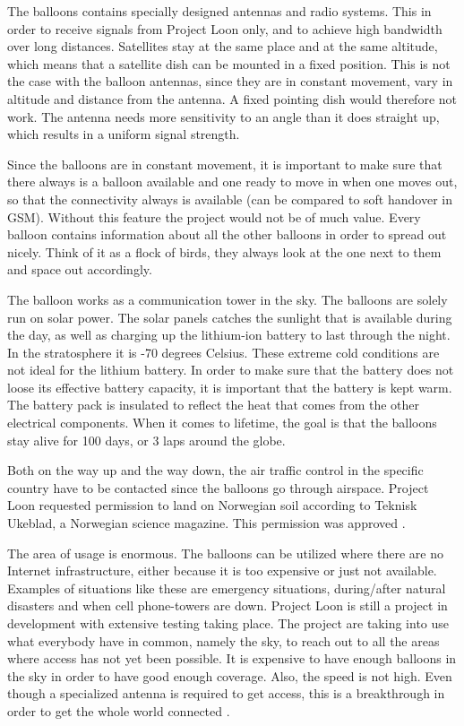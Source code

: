The balloons contains specially designed antennas and radio systems. This in order to receive signals from Project Loon only, and to achieve high bandwidth over long distances. Satellites stay at the same place and at the same altitude, which means that a satellite dish can be mounted in a fixed position. This is not the case with the balloon antennas, since they are in constant movement, vary in altitude and distance from the antenna. A fixed pointing dish would therefore not work. The antenna needs more sensitivity to an angle than it does straight up, which results in a uniform signal strength. 

Since the balloons are in constant movement, it is important to make sure that there always is a balloon available and one ready to move in when one moves out, so that the connectivity always is available (can be compared to soft handover in GSM). Without this feature the project would not be of much value. Every balloon contains information about all the other balloons in order to spread out nicely. Think of it as a flock of birds, they always look at the one next to them and space out accordingly.

The balloon works as a communication tower in the sky. The balloons are solely run on solar power. The solar panels catches the sunlight that is available during the day, as well as charging up the lithium-ion battery to last through the night. In the stratosphere it is -70 degrees Celsius. These extreme cold conditions are not ideal for the lithium battery. In order to make sure that the battery does not loose its effective battery capacity, it is important that the battery is kept warm. The battery pack is insulated to reflect the heat that comes from the other electrical components. When it comes to lifetime, the goal is that the balloons stay alive for 100 days, or 3 laps around the globe. 

Both on the way up and the way down, the air traffic control in the specific country have to be contacted since the balloons go through airspace. Project Loon requested permission to land on Norwegian soil according to Teknisk Ukeblad, a Norwegian science magazine. This permission was approved \cite{loonTU}.

The area of usage is enormous. The balloons can be utilized where there are no Internet infrastructure, either because it is too expensive or just not available. Examples of situations like these are emergency situations, during/after natural disasters and when cell phone-towers are down. Project Loon is still a project in development with extensive testing taking place. The project are taking into use what everybody have in common, namely the sky, to reach out to all the areas where access has not yet been possible. It is expensive to have enough balloons in the sky in order to have good enough coverage. Also, the speed is not high. Even though a specialized antenna is required to get access, this is a breakthrough in order to get the whole world connected \cite{loonYouTube, loonNorsk}.

